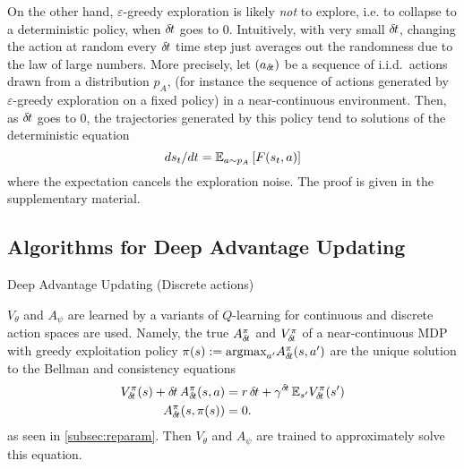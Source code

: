 On the other hand,
$\varepsilon$-greedy
exploration is likely \emph{not} to explore, i.e. to collapse to a deterministic
policy, when ${\delta\hspace{-.1em}t}$ goes to $0$.
Intuitively,
with very small ${\delta\hspace{-.1em}t}$, changing the action at random every ${\delta\hspace{-.1em}t}$ time
step just averages out the randomness due to the law of large numbers.
More precisely, let
$(a_{\delta\hspace{-.1em}t})$ be a sequence of i.i.d.\ actions drawn from a distribution $p_A$, (for instance
the sequence of actions generated by $\varepsilon$-greedy exploration on a
fixed policy) in a near-continuous environment. Then, as ${\delta\hspace{-.1em}t}$ goes
to $0$, the trajectories generated by
this policy tend to solutions of the deterministic equation
\begin{equation}
	ds_t/dt  = \mathbb{E}_{a\sim p_A}\left[F(s_t, a)\right]
\end{equation}
where the expectation cancels the exploration noise. The proof is given in the
supplementary material. 

\subsection{Algorithms for Deep Advantage Updating}
\label{subsec:algorithm}
\begin{algorithm}[ht]
  \caption{Deep Advantage Updating (Discrete actions)}
  \label{alg:dau}
	
\end{algorithm}

$V_{\theta}$ and $A_{\psi}$ are learned by a variants of $Q$-learning for continuous and
discrete action spaces are used. Namely, 
the true $A^\pi_{\delta\hspace{-.1em}t}$
and $V^\pi_{\delta\hspace{-.1em}t}$ of a near-continuous MDP with greedy exploitation
policy $\pi(s) \mathrel{\mathop{:}}=
\text{argmax}_{a'}A^\pi_{\delta\hspace{-.1em}t}(s, a')$
are the unique solution to the Bellman and consistency equations
\begin{align}
	V^{\pi}_{\delta\hspace{-.1em}t}(s) + {\delta\hspace{-.1em}t}\, A^{\pi}_{\delta\hspace{-.1em}t}(s, a) &=
	r\,{\delta\hspace{-.1em}t} + \gamma^{{\delta\hspace{-.1em}t}}  \,\mathbb{E}_{s'} V^{\pi}_{\delta\hspace{-.1em}t}(s')\label{eq:bellman_A}\\
	A^{\pi}_{\delta\hspace{-.1em}t}(s, \pi(s)) &= 0\label{eq:max_A}.
\end{align}
as seen in \ref{subsec:reparam}. Then $V_{\theta}$
and $A_{\psi}$ are trained to approximately solve this equation.

